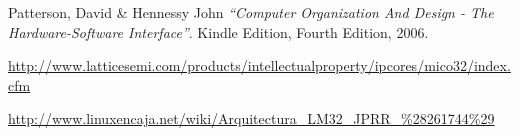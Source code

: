 \documentclass[twocolumn]{IEEEtran}
\begin{document}

\begin{thebibliography}{99}
 Patterson, David \& Hennessy John
{\em "`Computer Organization And Design - The Hardware-Software Interface"'}.
Kindle Edition, Fourth Edition, 2006.

 \url{http://www.latticesemi.com/products/intellectualproperty/ipcores/mico32/index.cfm}

 \url{http://www.linuxencaja.net/wiki/Arquitectura_LM32_JPRR_%28261744%29}
\end{thebibliography}
\end{document}
